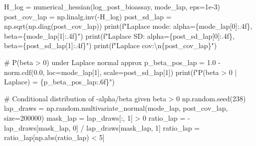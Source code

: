\documentclass[
  letterpaper,
  DIV=11,
  numbers=noendperiod]{scrartcl}
\newenvironment{Shaded}{\begin{snugshade}}{\end{snugshade}}
\newcommand{\BuiltInTok}[1]{\textcolor[rgb]{0.00,0.23,0.31}{#1}}
\newcommand{\CharTok}[1]{\textcolor[rgb]{0.13,0.47,0.30}{#1}}
\newcommand{\CommentTok}[1]{\textcolor[rgb]{0.37,0.37,0.37}{#1}}
\newcommand{\DecValTok}[1]{\textcolor[rgb]{0.68,0.00,0.00}{#1}}
\newcommand{\FloatTok}[1]{\textcolor[rgb]{0.68,0.00,0.00}{#1}}
\newcommand{\NormalTok}[1]{\textcolor[rgb]{0.00,0.23,0.31}{#1}}
\newcommand{\OperatorTok}[1]{\textcolor[rgb]{0.37,0.37,0.37}{#1}}
\newcommand{\SpecialCharTok}[1]{\textcolor[rgb]{0.37,0.37,0.37}{#1}}
\newcommand{\SpecialStringTok}[1]{\textcolor[rgb]{0.13,0.47,0.30}{#1}}
\begin{document}
\begin{Shaded}
\begin{Highlighting}[]
\NormalTok{H\_log }\OperatorTok{=}\NormalTok{ numerical\_hessian(log\_post\_bioassay, mode\_lap, eps}\OperatorTok{=}\FloatTok{1e{-}3}\NormalTok{)}
\NormalTok{post\_cov\_lap }\OperatorTok{=}\NormalTok{ np.linalg.inv(}\OperatorTok{{-}}\NormalTok{H\_log)}
\NormalTok{post\_sd\_lap  }\OperatorTok{=}\NormalTok{ np.sqrt(np.diag(post\_cov\_lap))}
\BuiltInTok{print}\NormalTok{(}\SpecialStringTok{f"Laplace mode:  alpha=}\SpecialCharTok{\{}\NormalTok{mode\_lap[}\DecValTok{0}\NormalTok{]}\SpecialCharTok{:.4f\}}\SpecialStringTok{, beta=}\SpecialCharTok{\{}\NormalTok{mode\_lap[}\DecValTok{1}\NormalTok{]}\SpecialCharTok{:.4f\}}\SpecialStringTok{"}\NormalTok{)}
\BuiltInTok{print}\NormalTok{(}\SpecialStringTok{f"Laplace SD:    alpha=}\SpecialCharTok{\{}\NormalTok{post\_sd\_lap[}\DecValTok{0}\NormalTok{]}\SpecialCharTok{:.4f\}}\SpecialStringTok{, beta=}\SpecialCharTok{\{}\NormalTok{post\_sd\_lap[}\DecValTok{1}\NormalTok{]}\SpecialCharTok{:.4f\}}\SpecialStringTok{"}\NormalTok{)}
\BuiltInTok{print}\NormalTok{(}\SpecialStringTok{f"Laplace cov:}\CharTok{\textbackslash{}n}\SpecialCharTok{\{}\NormalTok{post\_cov\_lap}\SpecialCharTok{\}}\SpecialStringTok{"}\NormalTok{)}

\CommentTok{\# P(beta \textgreater{} 0) under Laplace normal approx}
\NormalTok{p\_beta\_pos\_lap }\OperatorTok{=} \FloatTok{1.0} \OperatorTok{{-}}\NormalTok{ norm.cdf(}\FloatTok{0.0}\NormalTok{, loc}\OperatorTok{=}\NormalTok{mode\_lap[}\DecValTok{1}\NormalTok{], scale}\OperatorTok{=}\NormalTok{post\_sd\_lap[}\DecValTok{1}\NormalTok{])}
\BuiltInTok{print}\NormalTok{(}\SpecialStringTok{f"P(beta \textgreater{} 0 | Laplace) = }\SpecialCharTok{\{}\NormalTok{p\_beta\_pos\_lap}\SpecialCharTok{:.6f\}}\SpecialStringTok{"}\NormalTok{)}

\CommentTok{\# Conditional distribution of {-}alpha/beta given beta \textgreater{} 0}
\NormalTok{np.random.seed(}\DecValTok{238}\NormalTok{)}
\NormalTok{lap\_draws }\OperatorTok{=}\NormalTok{ np.random.multivariate\_normal(mode\_lap, post\_cov\_lap, size}\OperatorTok{=}\DecValTok{200000}\NormalTok{)}
\NormalTok{mask\_lap }\OperatorTok{=}\NormalTok{ lap\_draws[:, }\DecValTok{1}\NormalTok{] }\OperatorTok{\textgreater{}} \DecValTok{0}
\NormalTok{ratio\_lap }\OperatorTok{=} \OperatorTok{{-}}\NormalTok{lap\_draws[mask\_lap, }\DecValTok{0}\NormalTok{] }\OperatorTok{/}\NormalTok{ lap\_draws[mask\_lap, }\DecValTok{1}\NormalTok{]}
\NormalTok{ratio\_lap }\OperatorTok{=}\NormalTok{ ratio\_lap[np.}\BuiltInTok{abs}\NormalTok{(ratio\_lap) }\OperatorTok{\textless{}} \DecValTok{5}\NormalTok{]}


\end{Highlighting}
\end{Shaded}
\end{document}
